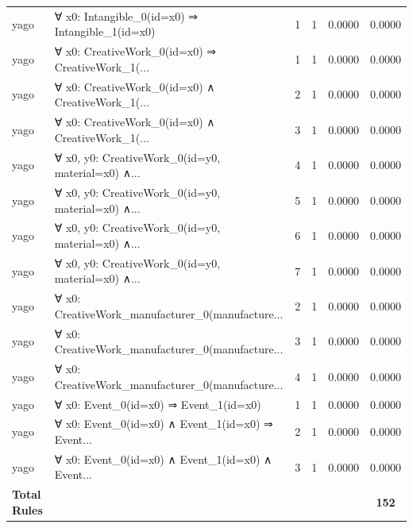 \documentclass[11pt,a4paper]{article}
\begin{document}
\begin{table}[h!]
\begin{longtable}{|l|p{6cm}|c|c|c|c|}
yago & ∀ x0: Intangible\_0(id=x0) ⇒ Intangible\_1(id=x0) & 1 & 1 & 0.0000 & 0.0000 \\
yago & ∀ x0: CreativeWork\_0(id=x0) ⇒ CreativeWork\_1(... & 1 & 1 & 0.0000 & 0.0000 \\
yago & ∀ x0: CreativeWork\_0(id=x0) ∧ CreativeWork\_1(... & 2 & 1 & 0.0000 & 0.0000 \\
yago & ∀ x0: CreativeWork\_0(id=x0) ∧ CreativeWork\_1(... & 3 & 1 & 0.0000 & 0.0000 \\
yago & ∀ x0, y0: CreativeWork\_0(id=y0, material=x0) ∧... & 4 & 1 & 0.0000 & 0.0000 \\
yago & ∀ x0, y0: CreativeWork\_0(id=y0, material=x0) ∧... & 5 & 1 & 0.0000 & 0.0000 \\
yago & ∀ x0, y0: CreativeWork\_0(id=y0, material=x0) ∧... & 6 & 1 & 0.0000 & 0.0000 \\
yago & ∀ x0, y0: CreativeWork\_0(id=y0, material=x0) ∧... & 7 & 1 & 0.0000 & 0.0000 \\
yago & ∀ x0: CreativeWork\_manufacturer\_0(manufacture... & 2 & 1 & 0.0000 & 0.0000 \\
yago & ∀ x0: CreativeWork\_manufacturer\_0(manufacture... & 3 & 1 & 0.0000 & 0.0000 \\
yago & ∀ x0: CreativeWork\_manufacturer\_0(manufacture... & 4 & 1 & 0.0000 & 0.0000 \\
yago & ∀ x0: Event\_0(id=x0) ⇒ Event\_1(id=x0) & 1 & 1 & 0.0000 & 0.0000 \\
yago & ∀ x0: Event\_0(id=x0) ∧ Event\_1(id=x0) ⇒ Event... & 2 & 1 & 0.0000 & 0.0000 \\
yago & ∀ x0: Event\_0(id=x0) ∧ Event\_1(id=x0) ∧ Event... & 3 & 1 & 0.0000 & 0.0000 \\
\hline
\textbf{Total Rules} & & & & & \textbf{152} \\
\hline
\end{longtable}
\end{table}
\end{document}

